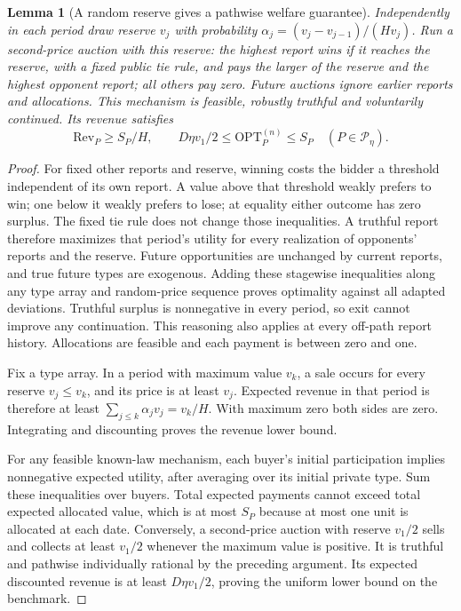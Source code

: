 \documentclass[11pt]{article}
\newtheorem{lemma}[theorem]{Lemma}
\theoremstyle{remark}\newtheorem{remark}[theorem]{Remark}
\begin{document}
\begin{lemma}[A random reserve gives a pathwise welfare guarantee]
Independently in each period draw reserve $v_j$ with probability
$\alpha_j=(v_j-v_{j-1})/(Hv_j)$. Run a second-price auction with this
reserve: the highest report wins if it reaches the reserve, with a fixed
public tie rule, and pays the larger of the reserve and the highest
opponent report; all others pay zero. Future auctions ignore earlier
reports and allocations. This mechanism is feasible, robustly truthful
and voluntarily continued. Its revenue satisfies
\[
 \mathrm{Rev}_P\geq S_P/H,
 \qquad
 D\eta v_1/2\leq\mathrm{OPT}^{(n)}_P\leq S_P
 \quad(P\in\mathcal P_\eta).
\]
\end{lemma}
\begin{proof}
For fixed other reports and reserve, winning costs the bidder a threshold
independent of its own report. A value above that threshold weakly prefers
to win; one below it weakly prefers to lose; at equality either outcome
has zero surplus. The fixed tie rule does not change those inequalities.
A truthful report therefore maximizes that period's utility for every
realization of opponents' reports and the reserve. Future opportunities
are unchanged by current reports, and true future types are exogenous.
Adding these stagewise inequalities along any type array and random-price
sequence proves optimality against all adapted deviations. Truthful
surplus is nonnegative in every period, so exit cannot improve any
continuation. This reasoning also applies at every off-path report
history. Allocations are feasible and each payment is between zero and
one.

Fix a type array. In a period with maximum value $v_k$, a sale occurs
for every reserve $v_j\leq v_k$, and its price is at least $v_j$.
Expected revenue in that period is therefore at least
$\sum_{j\leq k}\alpha_jv_j=v_k/H$. With maximum zero both sides are
zero. Integrating and discounting proves the revenue lower bound.

For any feasible known-law mechanism, each buyer's initial participation
implies nonnegative expected utility, after averaging over its initial
private type. Sum these inequalities over buyers. Total expected
payments cannot exceed total expected allocated value, which is at most
$S_P$ because at most one unit is allocated at each date. Conversely, a
second-price auction with reserve $v_1/2$ sells and collects at least
$v_1/2$ whenever the maximum value is positive. It is truthful and
pathwise individually rational by the preceding argument. Its expected
discounted revenue is at least $D\eta v_1/2$, proving the uniform lower
bound on the benchmark.
\end{proof}
\end{document}
